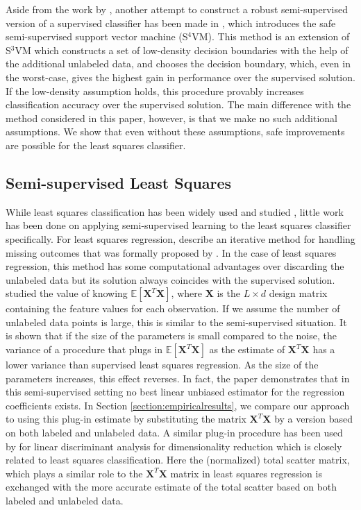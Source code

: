 \documentclass[twoside]{memoir}\usepackage[]{graphicx}\usepackage{xcolor}
\newcommand{\featdim}{d}
\newcommand{\Nlab}{L}
\begin{document}
Aside from the work by \citet{Loog2010,Loog2014b}, another attempt to construct a robust semi-supervised version of a supervised classifier has been made in \citep{Li2011}, which introduces the safe semi-supervised support vector machine (S$^4$VM). 
This method is an extension of S$^3$VM \citep{Bennett1998} which constructs a set of low-density decision boundaries with the help of the additional unlabeled data, and chooses the decision boundary, which, even in the worst-case, gives the highest gain in performance over the supervised solution. 
If the low-density assumption holds, this procedure provably increases classification accuracy over the supervised solution. 
The main difference with the method considered in this paper, however, is that we make no such additional assumptions. We show that even without these assumptions, safe improvements are possible for the least squares classifier.

\subsection*{Semi-supervised Least Squares}
While least squares classification has been widely used and studied \citep{Hastie2009, Poggio2003, Suykens1999}, little work has been done on applying semi-supervised learning to the least squares classifier specifically. For least squares regression, \citet{Little2002} describe an iterative method for handling missing outcomes that was formally proposed by \citet{Healy1956}. In the case of least squares regression, this method has some computational advantages over discarding the unlabeled data but its solution always coincides with the supervised solution. \citet{Shaffer1991} studied the value of knowing $\mathbb{E}[\mathbf{X}^T\mathbf{X}]$, where $\mathbf{X}$ is the $\Nlab \times \featdim$ design matrix containing the feature values for each observation. If we assume the number of unlabeled data points is large, this is similar to the semi-supervised situation. It is shown that if the size of the parameters is small compared to the noise, the variance of a procedure that plugs in $\mathbb{E}[\mathbf{X}^T\mathbf{X}]$ as the estimate of $\mathbf{X}^T\mathbf{X}$ has a lower variance than supervised least squares regression.  As the size of the parameters increases, this effect reverses. In fact, the paper demonstrates that in this semi-supervised setting no best linear unbiased estimator for the regression coefficients exists. In Section \ref{section:empiricalresults}, we compare our approach to using this plug-in estimate by substituting the matrix $\mathbf{X}^T\mathbf{X}$ by a version based on both labeled and unlabeled data. 
A similar plug-in procedure has been used by \citet{Fan2008} for linear discriminant analysis for dimensionality reduction which is closely related to least squares classification. Here the (normalized) total scatter matrix, which plays a similar role to the $\mathbf{X}^T\mathbf{X}$ matrix in least squares regression is exchanged with the more accurate estimate of the total scatter based on both labeled and unlabeled data.
\end{document}
